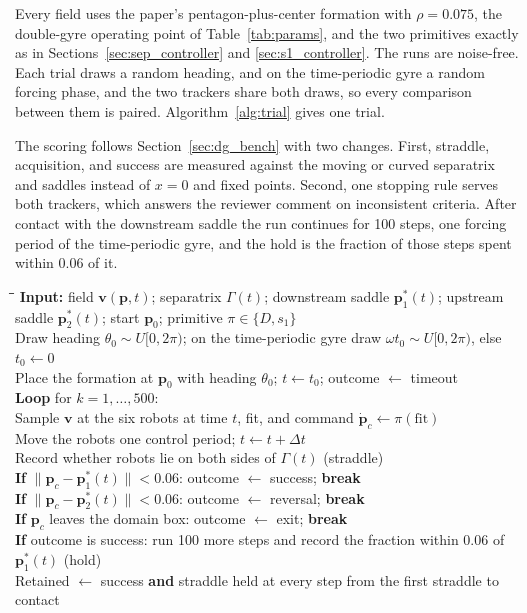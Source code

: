 \documentclass[11pt]{article}
\begin{document}
Every field uses the paper's pentagon-plus-center formation with
$\rho = 0.075$, the double-gyre operating point of Table~\ref{tab:params},
and the two primitives exactly as in Sections~\ref{sec:sep_controller}
and \ref{sec:s1_controller}. The runs are noise-free. Each trial draws a
random heading, and on the time-periodic gyre a random forcing phase, and
the two trackers share both draws, so every comparison between them is
paired. Algorithm~\ref{alg:trial} gives one trial.

The scoring follows Section~\ref{sec:dg_bench} with two changes. First,
straddle, acquisition, and success are measured against the moving or
curved separatrix and saddles instead of $x = 0$ and fixed points. Second,
one stopping rule serves both trackers, which answers the reviewer comment
on inconsistent criteria. After contact with the downstream saddle the run
continues for 100 steps, one forcing period of the time-periodic gyre, and
the hold is the fraction of those steps spent within 0.06 of it.

\begin{algorithm}[H]
\caption{One Monte Carlo trial on a test field}
\label{alg:trial}
\begin{tabbing}
\hspace{1.5em}\=\hspace{1.5em}\=\hspace{1.5em}\=\kill
\textbf{Input:} field $\mathbf{v}(\mathbf{p}, t)$; separatrix $\Gamma(t)$;
downstream saddle $\mathbf{p}^*_1(t)$; upstream saddle $\mathbf{p}^*_2(t)$;
start $\mathbf{p}_0$; primitive $\pi \in \{D, s_1\}$\\
Draw heading $\theta_0 \sim U[0, 2\pi)$; on the time-periodic gyre draw
$\omega t_0 \sim U[0, 2\pi)$, else $t_0 \leftarrow 0$\\
Place the formation at $\mathbf{p}_0$ with heading $\theta_0$;
$t \leftarrow t_0$; outcome $\leftarrow$ timeout\\
\textbf{Loop} for $k = 1, \ldots, 500$:\\
\> Sample $\mathbf{v}$ at the six robots at time $t$, fit, and command
$\dot{\mathbf{p}}_c \leftarrow \pi(\text{fit})$\\
\> Move the robots one control period; $t \leftarrow t + \Delta t$\\
\> Record whether robots lie on both sides of $\Gamma(t)$ (straddle)\\
\> \textbf{If} $\|\mathbf{p}_c - \mathbf{p}^*_1(t)\| < 0.06$:
outcome $\leftarrow$ success; \textbf{break}\\
\> \textbf{If} $\|\mathbf{p}_c - \mathbf{p}^*_2(t)\| < 0.06$:
outcome $\leftarrow$ reversal; \textbf{break}\\
\> \textbf{If} $\mathbf{p}_c$ leaves the domain box:
outcome $\leftarrow$ exit; \textbf{break}\\
\textbf{If} outcome is success: run 100 more steps and record the
fraction within 0.06 of $\mathbf{p}^*_1(t)$ (hold)\\
Retained $\leftarrow$ success \textbf{and} straddle held at every step
from the first straddle to contact
\end{tabbing}
\end{algorithm}
\end{document}
